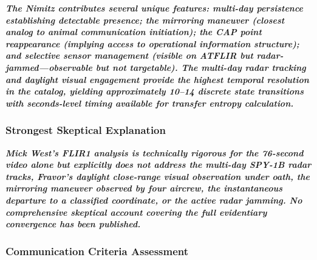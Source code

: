 \documentclass[11pt,letterpaper]{article}
\begin{document}
\textbf{\textit{The Nimitz contributes several unique features: multi-day persistence establishing detectable presence; the mirroring maneuver (closest analog to animal communication initiation); the CAP point reappearance (implying access to operational information structure); and selective sensor management (visible on ATFLIR but radar-jammed---observable but not targetable). The multi-day radar tracking and daylight visual engagement provide the highest temporal resolution in the catalog, yielding approximately 10--14 discrete state transitions with seconds-level timing available for transfer entropy calculation.}}


\subsubsection{Strongest Skeptical Explanation}

\textbf{\textit{Mick West's FLIR1 analysis is technically rigorous for the 76-second video alone but explicitly does not address the multi-day SPY-1B radar tracks, Fravor's daylight close-range visual observation under oath, the mirroring maneuver observed by four aircrew, the instantaneous departure to a classified coordinate, or the active radar jamming. No comprehensive skeptical account covering the full evidentiary convergence has been published.}}


\subsubsection{Communication Criteria Assessment}
\end{document}
